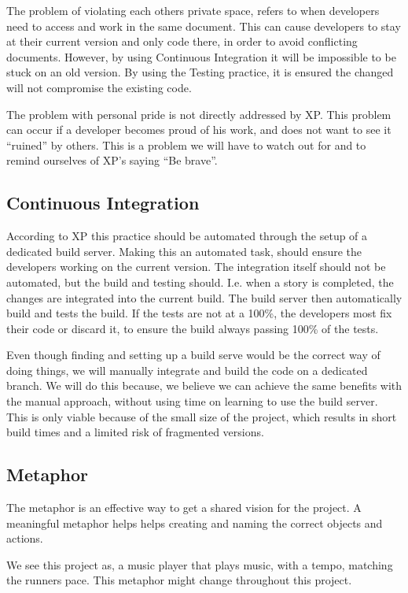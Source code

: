 The problem of violating each others private space, refers to when developers need to access and work in the same document. This can cause developers to stay at their current version and only code there, in order to avoid conflicting documents.
However, by using Continuous Integration it will be impossible to be stuck on an old version.
By using the Testing practice, it is ensured the changed will not compromise the existing code.

The problem with personal pride is not directly addressed by XP.
This problem can occur if a developer becomes proud of his work, and does not want to see it ``ruined'' by others.
This is a problem we will have to watch out for and to remind ourselves of XP's saying ``Be brave''.
 

\subsection{Continuous Integration}
According to XP this practice should be automated through the setup of a dedicated build server.
Making this an automated task, should ensure the developers working on the current version.
The integration itself should not be automated, but the build and testing should.
I.e. when a story is completed, the changes are integrated into the current build.
The build server then automatically build and tests the build.
If the tests are not at a 100\%, the developers most fix their code or discard it, to ensure the build always passing 100\% of the tests.

Even though finding and setting up a build serve would be the correct way of doing things, we will manually integrate and build the code on a dedicated branch.
We will do this because, we believe we can achieve the same benefits with the manual approach, without using time on learning to use the build server.
This is only viable because of the small size of the project, which results in short build times and a limited risk of fragmented versions.

\subsection{Metaphor}
The metaphor is an effective way to get a shared vision for the project.
A meaningful metaphor helps helps creating and naming the correct objects and actions.

We see this project as, a music player that plays music, with a tempo, matching the runners pace.
This metaphor might change throughout this project.

